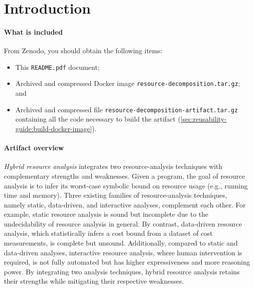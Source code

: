 
\section{Introduction}

\paragraph{What is included}

From Zenodo, you should obtain the following items:
\begin{itemize}
  \item This \texttt{README.pdf} document;
  \item Archived and compressed Docker image
        \texttt{resource-decomposition.tar.gz}; and
  \item Archived and compressed file
        \texttt{resource-decomposition-artifact.tar.gz} containing all the code
        necessary to build the artifact
        (\cref{sec:reusability-guide:build-docker-image}).
\end{itemize}

\paragraph{Artifact overview}

\emph{Hybrid resource analysis} integrates two resource-analysis techniques with
complementary strengths and weaknesses.
%
Given a program, the goal of resource analysis is to infer its worst-case
symbolic bound on resource usage (e.g., running time and memory).
%
Three existing families of resource-analysis techniques, namely static,
data-driven, and interactive analyses, complement each other.
%
For example, static resource analysis is sound but incomplete due to the
undecidability of resource analysis in general.
%
By contrast, data-driven resource analysis, which statistically infers a cost
bound from a dataset of cost measurements, is complete but unsound.
%
Additionally, compared to static and data-driven analyses, interactive resource
analysis, where human intervention is required, is not fully automated but has
higher expressiveness and more reasoning power.
%
By integrating two analysis techniques, hybrid resource analysis retains their
strengths while mitigating their respective weaknesses.

